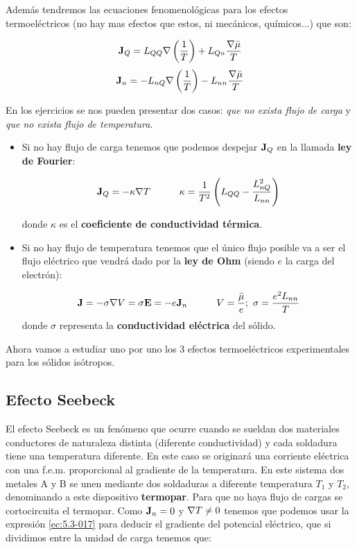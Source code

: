 \documentclass[12pt]{book}
\begin{document}
Además tendremos las ecuaciones fenomenológicas para los efectos termoeléctricos (no hay mas efectos que estos, ni mecánicos, químicos...) que son:

\begin{equation}
\textbf{J}_Q = L_{QQ} \nabla \left( \dfrac{1}{T} \right)  + L_{Qn} \dfrac{\nabla \bar{\mu}}{T}
\label{ec:5.3-016}
\end{equation} 
\begin{equation}
\textbf{J}_n = - L_{nQ} \nabla \left( \dfrac{1}{T} \right)  - L_{nn} \dfrac{\nabla \bar{\mu}}{T} \label{ec:5.3-017}
\end{equation}

En los ejercicios se nos pueden presentar dos casos: \textit{que no exista flujo de carga} y \textit{que no exista flujo de temperatura}. 

\begin{itemize}
\item Si no hay flujo de carga tenemos que podemos despejar $\textbf{J}_Q$ en la llamada \textbf{ley de Fourier}:

\begin{equation}
\textbf{J}_Q = - \kappa \nabla T \quad \quad \quad \kappa = \dfrac{1}{T^2} \left( L_{QQ} - \dfrac{L_{nQ}^2}{L_{nn}}  \right)
\end{equation}

donde $\kappa$ es el \textbf{coeficiente de conductividad térmica}.

\item Si no hay flujo de temperatura tenemos que el único flujo posible va a ser el flujo eléctrico que vendrá dado por la \textbf{ley de Ohm} (siendo $e$ la carga del electrón):



\begin{equation}
\textbf{J} = - \sigma \nabla V = \sigma \textbf{E}  = - e \textbf{J}_n \quad \quad \quad V = \dfrac{\bar{\mu}}{e}; \ \sigma = \dfrac{e^2 L_{nn}}{T}
\end{equation}
donde $\sigma$ representa la \textbf{conductividad eléctrica} del sólido.

\end{itemize}

Ahora vamos a estudiar uno por uno los 3 efectos termoeléctricos experimentales para los sólidos isótropos.

\subsection{Efecto Seebeck}

El efecto Seebeck es un fenómeno que ocurre cuando se sueldan dos materiales conductores de naturaleza distinta (diferente conductividad) y cada soldadura tiene una temperatura diferente. En este caso se originará una corriente eléctrica con una f.e.m. proporcional al gradiente de la temperatura. En este sistema dos metales A y B se unen mediante dos soldaduras a diferente temperatura $T_1$ y $T_2$, denominando a este dispositivo \textbf{termopar}. Para que no haya flujo de cargas se cortocircuita el termopar. Como $\textbf{J}_n = 0$ y $\nabla T \neq 0$ tenemos que podemos usar la expresión \ref{ec:5.3-017} para deducir el gradiente del potencial eléctrico, que si dividimos entre la unidad de carga tenemos que:
\end{document}
